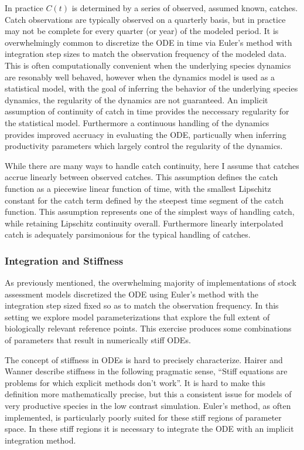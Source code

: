 %
In practice $C(t)$ is determined by a series of observed, assumed known, catches.
Catch observations are typically observed on a quarterly basis, but
in practice may not be complete for every quarter (or year) of the modeled
period. It is overwhelmingly common to discretize the ODE in time via Euler's
method with integration step sizes to match the observation frequency of the
modeled data. This is often computationally convenient when the underlying species
dynamics are resonably well behaved, however when the dynamics model is used
as a statistical model, with the goal of inferring the behavior of the
underlying species dynamics, the regularity of the dynamics are not guaranteed.
An implicit assumption of continuity of catch in time provides the neccessary
regularity for the statistical model. Furthermore a continuous handling of the
dynamics provides improved accruacy in evaluating the ODE, particually when
inferring productivity parameters which largely control the regularity of the
dynamics.

%
While there are many ways to handle catch continuity, here I assume that catches 
accrue linearly between observed catches. This assumption defines the catch
function as a piecewise linear function of time, with the smallest Lipschitz
constant for the catch term defined by the steepest time segment of the catch
function. This assumption represents one of the simplest ways of handling catch,
while retaining Lipschitz continuity overall. Furthermore linearly interpolated
catch is adequately parsimonious for the typical handling of catches.

%
\subsubsection{Integration and Stiffness}

%
As previously mentioned, the overwhelming majority of implementations of
stock assessment models discretized the ODE using Euler's method with the
integration step sized fixed so as to match the observation frequency. In this
setting we explore model parameterizations that explore the full extent of
biologically relevant reference points. This exercise produces some
combinations of parameters that result in numerically stiff ODEs.

%
The concept of stiffness in ODEs is hard to precisely characterize.
Hairer and Wanner \cite[p.2]{wanner_solving_1996} describe stiffness in the
following pragmatic sense, ``Stiff equations are problems for which explicit
methods don't work''. It is hard to make this definition more mathematically
precise, but this a consistent issue for models of very productive species in
the low contrast simulation. 
Euler's method, as often implemented, is particularly poorly suited for these
stiff regions of parameter space. In these stiff regions it is necessary to
integrate the ODE with an implicit integration method.

